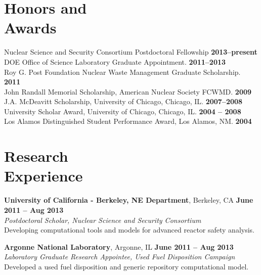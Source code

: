 \documentclass[margin,line]{resume}
\begin{document}
\begin{resume}
    \section{\mysidestyle Honors and\\Awards} 
                Nuclear Science and Security Consortium Postdoctoral Fellowship    \hfill \textbf{2013--present}\vspace{.5mm}\\%
		DOE Office of Science Laboratory Graduate Appointment.                \hfill \textbf{2011--2013}\vspace{.5mm}\\%
		Roy G. Post Foundation Nuclear Waste Management Graduate Scholarship.       \hfill \textbf{2011}\vspace{.5mm}\\%
		John Randall Memorial Scholarship, American Nuclear Society FCWMD.          \hfill \textbf{2009}\vspace{.5mm}\\%
		J.A. McDeavitt Scholarship, University of Chicago, Chicago, IL.        \hfill\textbf{2007--2008}\vspace{.5mm}\\%
		University Scholar Award, University of Chicago, Chicago, IL.        \hfill\textbf{2004 -- 2008}\vspace{.5mm}\\%
		Los Alamos Distinguished Student Performance Award, Los Alamos, NM.          \hfill\textbf{2004}\vspace{.5mm}\\%
    \section{\mysidestyle Research\\Experience}
    \textbf{University of California - Berkeley, NE Department}, Berkeley, CA \hfill \textbf{June 2011 -- Aug 2013}\\
		\textsl{Postdoctoral Scholar, Nuclear Science and Security Consortium}\\ 
                Developing computational tools and models for advanced reactor safety analysis.

    \textbf{Argonne National Laboratory}, Argonne, IL \hfill \textbf{June 2011 -- Aug 2013}\\
		\textsl{Laboratory Graduate Research Appointee, Used Fuel Disposition Campaign}\\ 
		Developed a used fuel disposition and generic repository computational model.


\end{resume}
\end{document}
